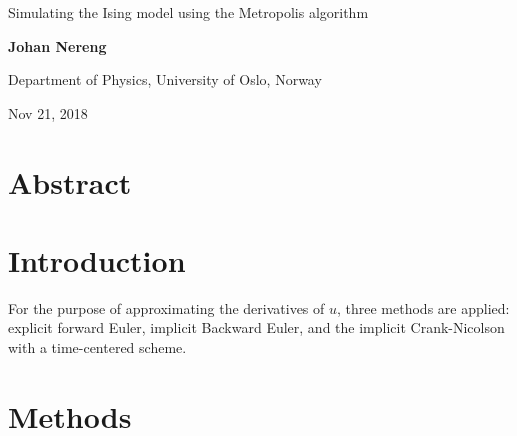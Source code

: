 \documentclass[%
oneside,                 %
final,                   %
10pt]{article}
\begin{document}

\newcommand{\exercisesection}[1]{\subsection*{#1}}






\thispagestyle{empty}

\begin{center}
{\LARGE\bf
\begin{spacing}{1.25}
Simulating the Ising model using the Metropolis algorithm
\end{spacing}
}
\end{center}


\begin{center}
{\bf Johan Nereng}
\end{center}

    \begin{center}
\centerline{{\small Department of Physics, University of Oslo, Norway}}
\end{center}
    

\begin{center}
Nov 21, 2018
\end{center}

\vspace{1cm}

\section{Abstract}
\section{Introduction}

For the purpose of approximating the derivatives of $u$, three methods are applied: explicit forward Euler, implicit Backward Euler, and the implicit Crank-Nicolson with a time-centered scheme.
\section{Methods}
\end{document}
